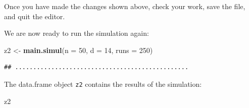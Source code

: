 \documentclass[12pt,a4paper]{book}
\newenvironment{Shaded}{\begin{snugshade}}{\end{snugshade}}
\newcommand{\DataTypeTok}[1]{\textcolor[rgb]{0.13,0.29,0.53}{#1}}
\newcommand{\DecValTok}[1]{\textcolor[rgb]{0.00,0.00,0.81}{#1}}
\newcommand{\KeywordTok}[1]{\textcolor[rgb]{0.13,0.29,0.53}{\textbf{#1}}}
\newcommand{\NormalTok}[1]{#1}
\newcommand{\StringTok}[1]{\textcolor[rgb]{0.31,0.60,0.02}{#1}}
\theoremstyle{definition}
\theoremstyle{definition}
\theoremstyle{definition}
\theoremstyle{remark}
\begin{document}
Once you have made the changes shown above, check your work, save the
file, and quit the editor.

We are now ready to run the simulation again:

\begin{Shaded}
\begin{Highlighting}[]
\NormalTok{z2 <-}\StringTok{ }\KeywordTok{main.simul}\NormalTok{(}\DataTypeTok{n =} \DecValTok{50}\NormalTok{, }\DataTypeTok{d =} \DecValTok{14}\NormalTok{, }\DataTypeTok{runs =} \DecValTok{250}\NormalTok{)}
\end{Highlighting}
\end{Shaded}

\begin{verbatim}
## ................................................
\end{verbatim}

The data.frame object \texttt{z2} contains the results of the
simulation:

\begin{Shaded}
\begin{Highlighting}[]
\NormalTok{z2}
\end{Highlighting}
\end{Shaded}
\end{document}
